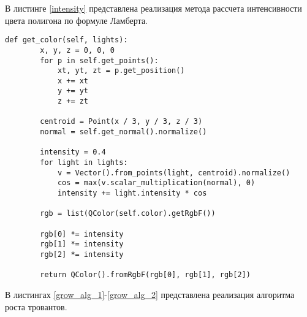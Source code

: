 В листинге \ref{intensity} представлена реализация метода рассчета интенсивности цвета полигона по формуле Ламберта.

\begin{lstlisting}[label=intensity,caption=Метод рассчета интенсивности цвета]
def get_color(self, lights):
        x, y, z = 0, 0, 0
        for p in self.get_points():
            xt, yt, zt = p.get_position()
            x += xt
            y += yt
            z += zt

        centroid = Point(x / 3, y / 3, z / 3)
        normal = self.get_normal().normalize()

        intensity = 0.4
        for light in lights:
            v = Vector().from_points(light, centroid).normalize()
            cos = max(v.scalar_multiplication(normal), 0)
            intensity += light.intensity * cos

        rgb = list(QColor(self.color).getRgbF())

        rgb[0] *= intensity
        rgb[1] *= intensity
        rgb[2] *= intensity

        return QColor().fromRgbF(rgb[0], rgb[1], rgb[2])
\end{lstlisting}

\newpage

В листингах \ref{grow_alg_1}-\ref{grow_alg_2} представлена реализация алгоритма роста тровантов.

